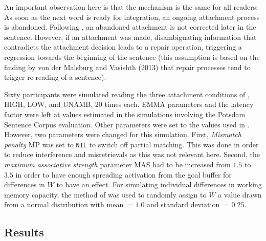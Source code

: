 \documentclass{cambridge7A}\usepackage[]{graphicx}\usepackage[]{color}
\begin{document}
An important observation here is that the mechanism is the same for all readers: As soon as the next word is ready for integration, an ongoing attachment process is abandoned.  
Following \cite{SwetsDesmetClifton2008}, an abandoned attachment is not corrected later in the sentence. However, if an attachment was made, disambiguating information that contradicts the attachment decision leads to a repair operation, triggering a regression towards the beginning of the sentence (this assumption is based on the finding by von der Malsburg and Vasishth (2013) that repair processes tend to trigger re-reading of a sentence).

Sixty participants were simulated reading the three attachment conditions of \cite{MalsburgVasishth2013}, HIGH, LOW, and UNAMB, 20 times each.
EMMA parameters and the latency factor were left at values estimated in the simulations involving the Potsdam Sentence Corpus evaluation. Other parameters were set to the values used in \cite{LewisVasishth2005}. However, two parameters were changed for this simulation. First, \emph{Mismatch penalty} MP was set to \texttt{NIL} to switch off partial matching. This was done in order to reduce interference and misretrievals as this was not relevant here. Second, the \emph{maximum associative strength} parameter MAS had to be increased from $1.5$ to $3.5$ in order to have enough spreading activation from the goal buffer for differences in $W$ to have an effect.
For simulating individual differences in working memory capacity, the method of \cite{DailyEtAl2001} was used to randomly assign to $W$ a value drawn from a normal distribution with mean $=1.0$ and standard deviation $=0.25$. 

\subsection{Results}
\end{document}
